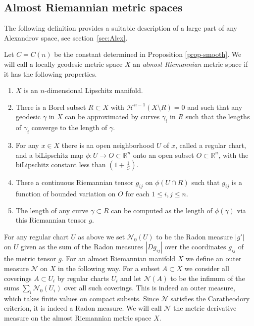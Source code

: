 \documentclass[12pt,leqno,intlimits]{amsart}
\numberwithin{equation}{section}
\theoremstyle{definition}
\theoremstyle{remark}
\newcommand{\R}{\mathbb{R}}
\begin{document}

\subsection{Almost Riemannian metric spaces}
The following definition provides a suitable description of a  large part of any Alexandrov space, see section~\ref{sec:Alex}.

 Let  $C =C(n)$ be the constant determined in  Proposition \ref{prop-smooth}. We will call  a locally geodesic metric space
 $X$ an \emph{almost Riemannian} metric space  if it has the following properties.
 \begin{enumerate}
 \item  $X$ is an $n$-dimensional Lipschitz manifold.
 \item  There is   a Borel subset $R\subset X$ with $\mathcal H^{n-1} (X\setminus R)=0$ and such that  any geodesic
 $\gamma$ in $X$ can be approximated by curves $\gamma _i$ in $R$ such that the lengths of $\gamma _i$ converge to the length of  $\gamma$.
\item For any  $x\in X$ there is an  open neighborhood $U$ of $x$, called a regular chart, and  a biLipschitz map
$\phi:U\to O\subset \R^n$ onto an open subset $O\subset \R^n$, with the biLipschitz constant less than $(1+\frac 1 C)$.
 \item There a continuous Riemannian tensor $g_{ij} $ on $\phi (U\cap R)$ such that $g_{ij}$ is a  function of bounded variation on $O$
for each $1\leq i,j \leq n$.
 \item The length of any curve $\gamma \subset R$ can be computed as the length of $\phi (\gamma )$ via this Riemannian tensor $g$.
\end{enumerate}

For any regular chart $U$ as above we set $\mathcal N_0 (U)$ to be the Radon measure $|g'|$ on $U$ given as the sum of
the Radon measures $|D g_{ij}|$ over the coordinates $ g_{ij}$ of the metric tensor $g$.
For an almost Riemannian manifold $X$ we define an outer measure $\mathcal N$ on $X$  in the following way.
For a subset $A\subset X$ we consider all  coverings $A\subset U_i$ by regular charts $U_i$ and let $\mathcal N(A)$
to be the infimum of the sums $\sum_i \mathcal N_0 (U_i)$  over all such coverings.  This is indeed an outer measure, which takes finite values on compact subsets.  Since $\mathcal N$  satisfies the Caratheodory criterion, it is indeed a Radon measure.  We will call $\mathcal N$ the metric derivative measure on the almost Riemannian metric space $X$.
\end{document}
